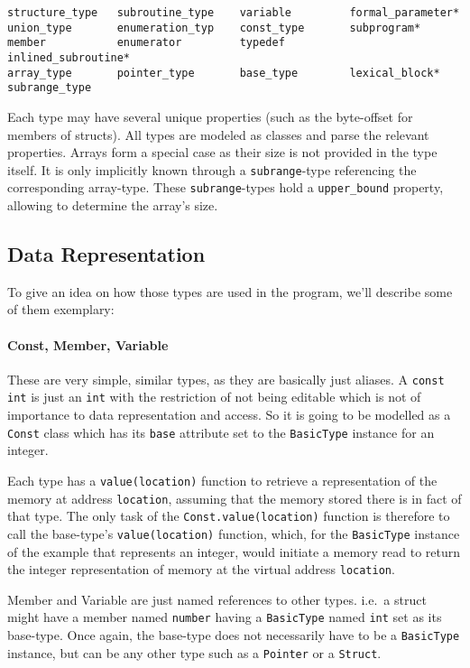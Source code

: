 \begin{lstlisting}[frame=single,caption=Used types,label=lst:types]
structure_type   subroutine_type    variable         formal_parameter*            
union_type       enumeration_typ    const_type       subprogram* 
member           enumerator         typedef          inlined_subroutine*
array_type       pointer_type       base_type        lexical_block*         
subrange_type                                           
\end{lstlisting}

Each type may have several unique properties (such as the byte-offset for members of structs). All types are modeled as classes and parse the relevant properties.
Arrays form a special case as their size is not provided in the type itself. It is only implicitly known through a \texttt{subrange}-type referencing the corresponding array-type.
These \texttt{subrange}-types hold a \texttt{upper\_bound} property, allowing to determine the array’s size.

\subsection{Data Representation}
To give an idea on how those types are used in the program, we’ll describe some of them exemplary:
\paragraph{Const, Member, Variable} These are very simple, similar types, as they are basically just aliases.
    A \texttt{const int} is just an \texttt{int} with the restriction of not being editable
    which is not of importance to data representation and access. So it is going to be modelled as a
    \texttt{Const} class which has its \texttt{base} attribute set to the \texttt{BasicType} instance for an
    integer.
    
    Each type has a \texttt{value(location)} function to retrieve a representation of the memory at address \texttt{location}, assuming
    that the memory stored there is in fact of that type.
    The only task of the \texttt{Const.value(location)} function is therefore to call the base-type’s \texttt{value(location)} function,
    which, for the \texttt{BasicType} instance of the example that represents an integer, would initiate a memory read to return the integer representation
    of memory at the virtual address \texttt{location}.
    
    Member and Variable are just named references to other types. i.e.~a struct might have a member named
    \texttt{number} having a \texttt{BasicType} named \texttt{int} set as its base-type.
    Once again, the base-type does not necessarily have to be a \texttt{BasicType} instance, but can be any other type such as a \texttt{Pointer} or a \texttt{Struct}.

